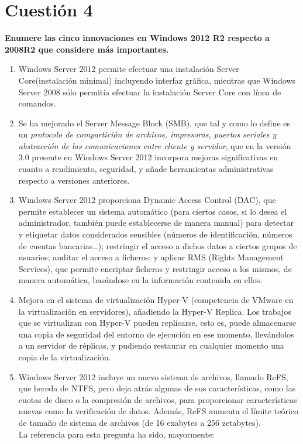 \documentclass[a4paper,11pt]{article}
\newenvironment{answer}{%
\begin{list}{}{%
}%
\item[]}{\end{list}}
\begin{document}
\section{Cuestión 4}
\textbf{Enumere las cinco innovaciones en Windows 2012 R2 respecto a 2008R2 que considere más importantes.}
\begin{answer}
\begin{enumerate}
 \item Windows Server 2012 permite efectuar una instalación Server Core(instalación minimal) incluyendo interfaz gráfica,
 mientras que Windows Server 2008 sólo permitía efectuar la instalación Server Core con línea de comandos.
 
 \item \cite{smbi} Se ha mejorado el Server Message Block (SMB), que tal y como lo define \cite{smb} es un 
 \textit{protocolo de compartición de archivos, impresoras, puertos seriales y abstracción de las comunicaciones entre 
 cliente y servidor}, que en la versión 3.0 presente en Windows Server 2012 incorpora mejoras significativas en cuanto a 
 rendimiento, seguridad, y añade herramientas administrativas respecto a versiones anteriores.
 
 \item \cite{dac}Windows Server 2012 proporciona Dynamic Access Control (DAC), que permite establecer un sistema automático (para
 ciertos casos, si lo desea el administrador, también puede establecerse de manera manual) para detectar y etiquetar
 datos considerados sensibles (números de identificación, números de cuentas bancarias\ldots); restringir el acceso a
 dichos datos a ciertos grupos de usuarios; auditar el acceso a ficheros; y aplicar RMS (Rights Management Services), que permite
 encriptar ficheros y restringir acceso a los mismos, de manera automática, basándose en la información contenida en ellos.
 
 \item Mejora en el sistema de virtualización Hyper-V (competencia de VMware en la virtualización en servidores),
 añadiendo la Hyper-V Replica. Los trabajos que se virtualizan con Hyper-V pueden replicarse, esto es, puede almacenarse
 una copia de seguridad del entorno de ejecución en ese momento, llevándolos a un servidor de réplicas, y pudiendo
 restaurar en cualquier momento una copia de la virtualización.
 
 \item Windows Server 2012 incluye un nuevo sistema de archivos, llamado ReFS, que hereda de NTFS, pero deja atrás
 algunas de sus características, como las cuotas de disco o la compresión de archivos, para proporcionar características
 nuevas como la verificación de datos. Además, ReFS aumenta el límite teórico de tamaño de sistema de archivos (de 16
 exabytes a 256 zetabytes).\\
 
 La referencia para esta pregunta ha sido, mayormente: \cite{techr}	
\end{enumerate}
\end{answer}
\end{document}
